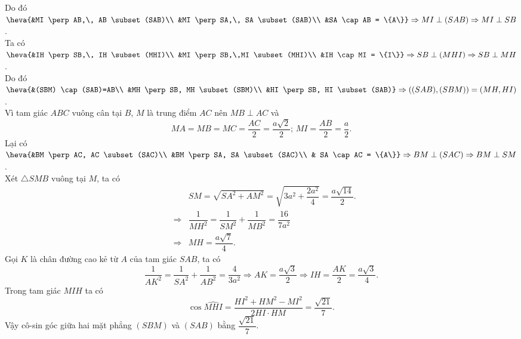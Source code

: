 \begin{ex}
{		Do đó $\heva{&MI \perp AB,\, AB \subset (SAB)\\ &MI \perp SA,\, SA \subset (SAB)\\ &SA \cap AB = \{A\}} \Rightarrow MI \perp (SAB) \Rightarrow MI  \perp SB$.\\
		Ta có $\heva{&IH \perp SB,\, IH \subset (MHI)\\ &MI \perp SB,\,MI \subset (MHI)\\ &IH \cap  MI = \{I\}} \Rightarrow SB \perp (MHI) \Rightarrow SB \perp MH$.\\
		Do đó $\heva{&(SBM) \cap (SAB)=AB\\  &MH \perp SB, MH \subset (SBM)\\ &HI \perp SB, HI \subset (SAB)} \Rightarrow \left((SAB),(SBM)\right)= \left(MH,HI\right)$.\\
		Vì tam giác $ABC$ vuông cân tại $B$, $M$ là trung điểm $AC$ nên $MB \perp AC$ và 
		$$MA=MB=MC=\dfrac{AC}{2}=\dfrac{a\sqrt{2}}{2};\, MI=\dfrac{AB}{2}=\dfrac{a}{2}.$$ 
		Lại có $\heva{&BM  \perp AC, AC \subset (SAC)\\ &BM \perp SA, SA \subset (SAC)\\ & SA \cap AC = \{A\}} \Rightarrow BM \perp (SAC) \Rightarrow BM \perp SM$.\\
		Xét $\triangle SMB$  vuông tại $M$, ta có
		\begin{eqnarray*}
			&& SM=\sqrt{SA^2+AM^2}=\sqrt{3a^2+\dfrac{2a^2}{4}}=\dfrac{a\sqrt{14}}{2}.\\ 
			&\Rightarrow&  \dfrac{1}{MH^2}=\dfrac{1}{SM^2}+\dfrac{1}{MB^2}=\dfrac{16}{7a^2}\\
			 &\Rightarrow& MH=\dfrac{a\sqrt{7}}{4}.
		\end{eqnarray*}
		Gọi $K$ là chân đường cao kẻ từ $A$ của tam  giác $SAB$, ta có
		$$\dfrac{1}{AK^2}=\dfrac{1}{SA^2}+\dfrac{1}{AB^2}=\dfrac{4}{3a^2} \Rightarrow AK=\dfrac{a\sqrt{3}}{2}  \Rightarrow IH=\dfrac{AK}{2}=\dfrac{a\sqrt{3}}{4}.$$
		Trong tam giác  $MIH$ ta có
		 $$\cos \widehat{MHI}=\dfrac{HI^2+HM^2-MI^2}{2HI\cdot HM}=\dfrac{\sqrt{21}}{7}.$$
		Vậy cô-sin góc giữa hai mặt phẳng $\left( SBM \right)$ và $\left( SAB \right)$  bằng $\dfrac{\sqrt{21}}{7}$.
	} 
\end{ex}

